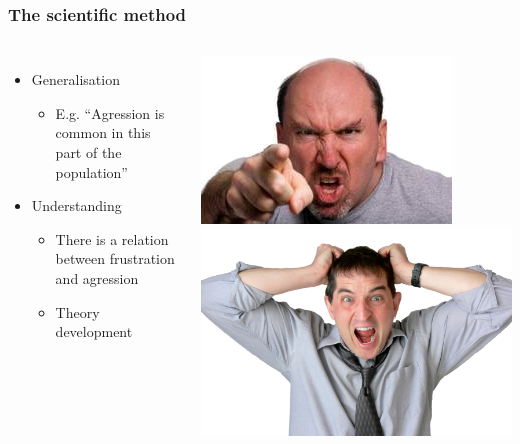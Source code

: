 \documentclass{beamer}
\begin{document}
\begin{frame}
  \frametitle{The scientific method}

  \begin{columns}[c]

    \begin{itemize}
      \item Generalisation
        \begin{itemize}
          \item E.g. ``Agression is common in this part of the population''
        \end{itemize}
      \item Understanding
        \begin{itemize}
          \item There is a relation between frustration and agression
          \item Theory development
        \end{itemize}
    \end{itemize}

    \includegraphics[width=\textwidth]{img/les1-05}
    \vspace*{1cm}
    \includegraphics[width=\textwidth]{img/les1-06}

  \end{columns}
\end{frame}
\end{document}
